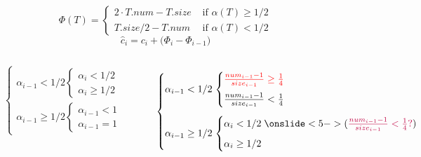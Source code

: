 \begin{frame}{}
  \[
    \Phi(T) = \left.
    \begin{cases}
      2 \cdot T.num - T.size & \text{ if } \alpha(T) \ge 1/2	\\
      T.size/2 - T.num	     & \text{ if } \alpha(T) < 1/2
    \end{cases} \right.
  \]
  \[
    \hat{c}_i = c_i + \Big(\Phi_{i} - \Phi_{i-1}\Big)
  \]

  \pause
  \vspace{0.20cm}
  \centerline{\large \it {}}

  \vspace{0.60cm}
  \begin{columns}
      \pause
      \centerline{\large \textsc{}}
      \[
	\left.
	\begin{cases}
	  \alpha_{i-1} < 1/2 \left.
	  \begin{cases}
	    \alpha_{i} < 1/2 \\[6pt]
	    \alpha_{i} \ge 1/2
	  \end{cases} \right.
	  \\[20pt]
	  \alpha_{i-1} \ge 1/2 \left.
	    \begin{cases}
	      \alpha_{i-1} < 1 \\[6pt] 
	      \alpha_{i-1} = 1
	    \end{cases} \right.
	\end{cases} \right.
      \]
      \pause
      \centerline{\large \textsc{}}
      \[
	\left.
	\begin{cases}
	  \alpha_{i-1} < 1/2 \left.
	    \begin{cases}
	      \red{\frac{num_{i-1} - 1}{size_{i-1}} \ge \frac{1}{4}} \\[6pt]
	      \frac{num_{i-1} - 1}{size_{i-1}} < \frac{1}{4}
	    \end{cases} \right.
	  \\[20pt]
	  \alpha_{i-1} \ge 1/2 \left.
	  \begin{cases}
	    \alpha_{i} < 1/2\; \onslide<5->{(\purple{\frac{num_{i-1} - 1}{size_{i-1}} < \frac{1}{4}?})}  \\[6pt]
	    \alpha_{i} \ge 1/2
	  \end{cases} \right.
	\end{cases} \right.
      \]
  \end{columns}
\end{frame}

